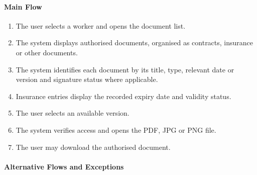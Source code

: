 \paragraph{Main Flow}

\begin{enumerate}
    \item The user selects a worker
    and opens the document list.
    \item The system displays authorised documents,
    organised as contracts, insurance
    or other documents.
    \item The system identifies each document
    by its title, type, relevant date or version
    and signature status where applicable.
    \item Insurance entries display the recorded
    expiry date and validity status.
    \item The user selects an available version.
    \item The system verifies access
    and opens the PDF, JPG or PNG file.
    \item The user may download
    the authorised document.
\end{enumerate}

\paragraph{Alternative Flows and Exceptions}

